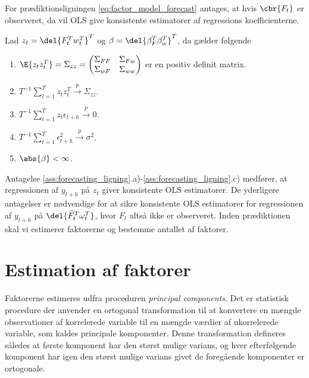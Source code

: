 For prædiktionsligningen \eqref{eq:factor_model_forecast} antages, at hvis \(\cbr{F_t}\) er observeret, da vil OLS give konsistente estimatorer af regressions koefficienterne.
%
\begin{ass}[Prædiktionsligning] \label{ass:forecasting_ligning}
Lad \(z_t = \del{F_t^T w_t^T}^T\) og \(\beta = \del{\beta_F^T \beta_w^T}^T\), da gælder følgende
\begin{enumerate}[label=\alph*)]
\item \(\E{z_t z_t^T} = \Sigma_{zz} = \begin{pmatrix}
\Sigma_{FF} & \Sigma_{F w} \\
\Sigma_{w F} & \Sigma_{w w}
\end{pmatrix} \) er en positiv definit matrix.
\item \(T^{-1} \sum_{t=1}^T z_t z_t^T \overset{p}{\rightarrow} \Sigma_{zz}\).
\item \(T^{-1} \sum_{t=1}^T z_t \epsilon_{t+h} \overset{p}{\rightarrow} 0\).
\item  \(T^{-1} \sum_{t=1}^T \epsilon_{t+h}^2 \overset{p}{\rightarrow} \sigma^2\).
\item \(\abs{\beta} < \infty\).
\end{enumerate}
\end{ass}
%
Antagelse \ref{ass:forecasting_ligning}.a)-\ref{ass:forecasting_ligning}.c) medfører, at regressionen af \(y_{t+h}\) på $z_t$ giver konsistente OLS estimatorer.
De yderligere antagelser er nødvendige for at sikre konsistente OLS estimatorer for regressionen af \(y_{t+h}\) på \(\del{\widehat{F}_t^T \omega_t^T}\), hvor \(F_t\) altså ikke er observeret.
Inden prædiktionen skal vi estimerer faktorerne og bestemme antallet af faktorer.

\section{Estimation af faktorer}
Faktorerne estimeres udfra proceduren \textit{principal components}.
Det er statistisk procedure der anvender en ortogonal transformation til at konvertere en mængde observationer af korrelerede variable til en mængde værdier af ukorrelerede variable, som kaldes principale komponenter.
Denne transformation defineres således at første komponent har den størst mulige varians, og hver efterfølgende komponent har igen den størst mulige varians givet de foregående komponenter er ortogonale.

